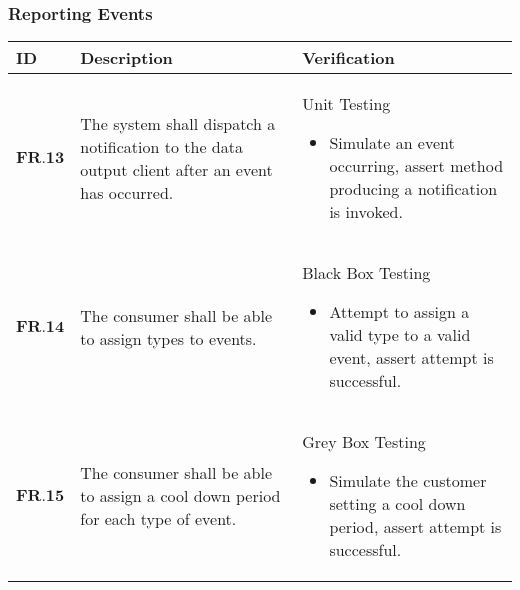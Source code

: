 \subsubsection{Reporting Events}
\begin{longtable}[H]{| p{1.5cm}| p{6cm}| p{9cm}|}
        \hline
        \cellcolor{titleColor}\textbf{ID}    & \cellcolor{titleColor}\textbf{Description}                                                                                                                                              & \cellcolor{titleColor}\textbf{Verification}                                                                                                                                                                                                                                                                                                                                      \\ \hline
        $\textbf{FR.13}$ & The system shall dispatch a notification to the data output client after an event has occurred.                                                                  & Unit Testing\begin{itemize}\item Simulate an event occurring, assert method producing a notification is invoked.\end{itemize}                                                                                                                                                                                                               \\ \hline
        $\textbf{FR.14}$ & The consumer shall be able to assign types to events.                                                                                                            & Black Box Testing\begin{itemize}\item Attempt to assign a valid type to a valid event, assert attempt is successful.\end{itemize}                                                                                                                                                                                                                \\ \hline
        $\textbf{FR.15}$ & The consumer shall be able to assign a cool down period for each type of event.                                                                                  & Grey Box Testing\begin{itemize}\item Simulate the customer setting a cool down period, assert attempt is successful.\end{itemize}                                                                                                                                                                                                                \\ \hline

\end{longtable}
